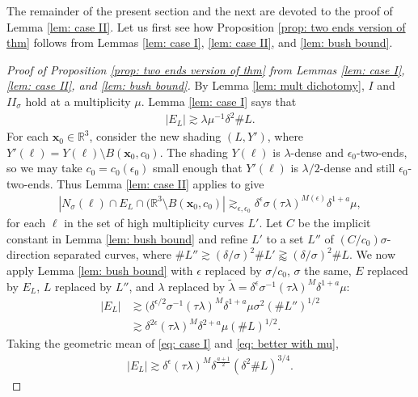 \documentclass[12pt]{amsart}
\newcommand{\x}{{\bf{x}}}
\numberwithin{equation}{section}
\newcommand{\R}{\mathbb{R}}
\newcommand{\1}{\mathbbm{1}}
\renewcommand{\x}{\mathbf x}
\begin{document}
The remainder of the present section and the next are devoted to the proof of Lemma \ref{lem: case II}. Let us first see how Proposition \ref{prop: two ends version of thm} follows from Lemmas \ref{lem: case I}, \ref{lem: case II}, and \ref{lem: bush bound}. 

\begin{proof}[Proof of Proposition \ref{prop: two ends version of thm} from Lemmas \ref{lem: case I}, \ref{lem: case II}, and \ref{lem: bush bound}]
    By Lemma \ref{lem: mult dichotomy}, $I$ and $II_\sigma$ hold at a multiplicity $\mu$. Lemma \ref{lem: case I} says that 
    \begin{align}\label{eq: case I}
        |E_L| \gtrsim \lambda \mu^{-1} \delta^2 \#L. 
    \end{align}
    For each $\x_0 \in \R^3$, consider the new shading $(L,Y')$, where $Y'(\ell) = Y(\ell) \setminus B(\x_0, c_0)$. The shading $Y(\ell)$ is $\lambda$-dense and $\epsilon_0$-two-ends, so we may take $c_0 = c_0({\epsilon_0})$ small enough that $Y'(\ell)$ is $\lambda/2$-dense and still $\epsilon_0$-two-ends. Thus Lemma \ref{lem: case II} applies to give
    \begin{align}\label{eq: two-ends case II}
        |N_\sigma(\ell) \cap E_L \cap (\R^3 \setminus B(\x_0,c_0)| \gtrsim_{\epsilon, \epsilon_0} \delta^{\epsilon} \sigma (\tau \lambda)^{M(\epsilon)} \delta^{1 + a} \mu,
    \end{align}
    for each $\ell$ in the set of high multiplicity curves $L'$. 
    Let $C$ be the implicit constant in Lemma \ref{lem: bush bound}
    and refine $L'$ to a set $L''$ of $(C/c_0)\sigma$-direction separated curves, where $\# L'' \gtrsim (\delta/\sigma)^2 \#L' \gtrapprox (\delta / \sigma)^2 \# L$. We now apply Lemma \ref{lem: bush bound} with $\epsilon$ replaced by $\sigma / c_0$, $\sigma$ the same, $E$ replaced by $E_L$, $L$ replaced by $L''$, and $\lambda$ replaced by $\tilde \lambda = \delta^\epsilon \sigma^{-1} (\tau \lambda)^M \delta^{1 + a} \mu$:
    \begin{align}\label{eq: better with mu}
        |E_L| &\gtrsim (\delta^{\epsilon/2} \sigma^{-1} (\tau \lambda)^M \delta^{1+a} \mu \sigma^2 (\# L'')^{1/2} \\
        &\gtrsim \delta^{2 \epsilon} (\tau \lambda)^M \delta^{2+a} \mu (\# L)^{1/2}.
    \end{align}
    Taking the geometric mean of \eqref{eq: case I} and \eqref{eq: better with mu}, 
    \begin{align}
        |E_L| \gtrsim \delta^{\epsilon} (\tau \lambda)^{M} \delta^{\frac{a + 1}{2}} (\delta^2 \# L)^{3/4}.
    \end{align}
\end{proof}
\end{document}
